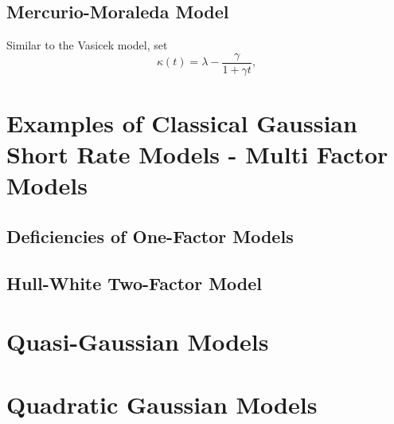 \documentclass[12pt]{article}
\begin{document}
  \subsection{Mercurio-Moraleda Model}

  Similar to the Vasicek model, set
  \begin{equation}
    \kappa(t)=\lambda-\frac{\gamma}{1+\gamma t},
  \end{equation}
    
    
    
\section{Examples of Classical Gaussian Short Rate Models - Multi Factor Models}

  \subsection{Deficiencies of One-Factor Models}

  

  \subsection{Hull-White Two-Factor Model}
    
    
    
    
    
    
    
    
    
    
    
    
    
    
    
    
    
    


\section{Quasi-Gaussian Models}


\section{Quadratic Gaussian Models}
\end{document}
